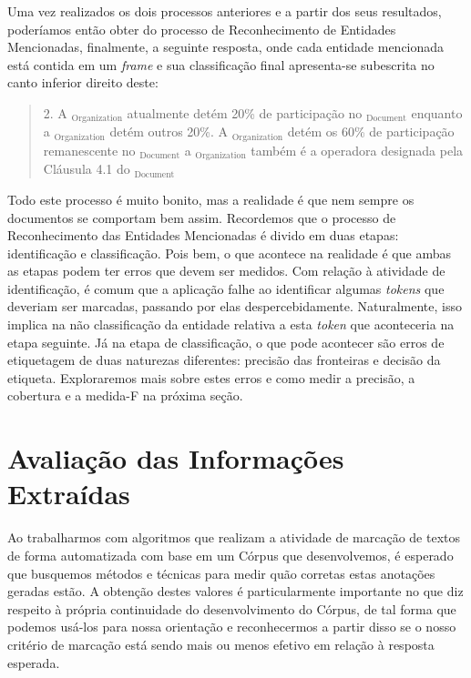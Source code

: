 \documentclass[11pt]{report}
\begin{document}
Uma vez realizados os dois processos anteriores e a partir dos seus resultados, poderíamos então obter do processo de Reconhecimento de Entidades Mencionadas,
finalmente, a seguinte resposta, onde cada entidade mencionada está contida em um \textit{frame} e sua classificação final apresenta-se subescrita no canto inferior direito deste:

\begin{quote}
  \begin{varwidth}{0.95\textwidth}
  2. A $_{\text{Organization}}$ atualmente detém 20\% de participação no $_{\text{Document}}$ enquanto a $_{\text{Organization}}$
  detém outros 20\%. A $_{\text{Organization}}$ detém os 60\% de participação remanescente no $_{\text{Document}}$ a
  $_{\text{Organization}}$ também é a operadora designada pela Cláusula 4.1 do $_{\text{Document}}$
  \end{varwidth}
\end{quote}

Todo este processo é muito bonito, mas a realidade é que nem sempre os documentos se comportam bem assim. Recordemos que o processo de Reconhecimento das Entidades Mencionadas
é divido em duas etapas: identificação e classificação. Pois bem, o que acontece na realidade é que ambas as etapas podem ter erros que devem ser medidos. Com relação
à atividade de identificação, é comum que a aplicação falhe ao identificar algumas \textit{tokens} que deveriam ser marcadas, passando por elas despercebidamente. Naturalmente, isso
implica na não classificação da entidade relativa a esta \textit{token} que aconteceria na etapa seguinte. Já na etapa de classificação, o que pode acontecer são erros de etiquetagem
de duas naturezas diferentes: precisão das fronteiras e decisão da etiqueta. Exploraremos mais sobre estes erros e como medir a precisão, a cobertura e a medida-F na próxima seção.

\section{Avaliação das Informações Extraídas}

\indent\indent Ao trabalharmos com algoritmos que realizam a atividade de marcação de textos de forma automatizada com base em um Córpus que desenvolvemos, é
esperado que busquemos métodos e técnicas para medir quão corretas estas anotações geradas estão. A obtenção destes valores é particularmente
importante no que diz respeito à própria continuidade do desenvolvimento do Córpus, de tal forma que podemos usá-los para nossa orientação e
reconhecermos a partir disso se o nosso critério de marcação está sendo mais ou menos efetivo em relação à resposta esperada. 
\end{document}
